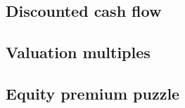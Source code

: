
\subsection{Discounted cash flow}

\subsection{Valuation multiples}

\subsection{Equity premium puzzle}


